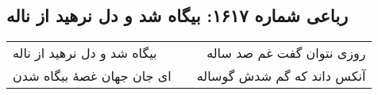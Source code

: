 \begin{center}
\section*{رباعی شماره ۱۶۱۷: بیگاه شد و دل نرهید از ناله}
\label{sec:1617}
\begin{longtable}{l p{0.5cm} r}
بیگاه شد و دل نرهید از ناله
&&
روزی نتوان گفت غم صد ساله
\\
ای جان جهان غصهٔ بیگاه شدن
&&
آنکس داند که گم شدش گوساله
\\
\end{longtable}
\end{center}
